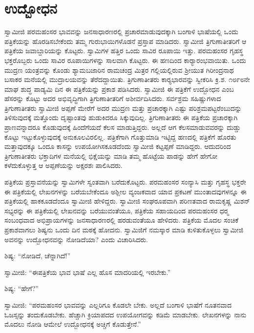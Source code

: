 
\chapter{ಉದ್ಬೋಧನ }

 ಸ್ವಾಮೀಜಿ ಪರಮಹಂಸರ ಭಾವವನ್ನು ಜನಸಾಧಾರಣರಲ್ಲಿ ಪ್ರಚಾರಮಾಡುವುದಕ್ಕಾಗಿ ಬಂಗಾಳಿ ಭಾಷೆಯಲ್ಲಿ ಒಂದು ಪತ್ರಿಕೆಯನ್ನು ಹೊರಡಿಸಬೇಕೆಂದು ತಮ್ಮ ಗುರುಭಾಯಿಗಳೊಡನೆ ಪ್ರಸ್ತಾಪ ಮಾಡಿದರು. ಸ್ವಾಮೀಜಿ ತ್ರಿಗುಣಾತೀತರಿಗೆ ಆ ಪತ್ರಿಕೆಯ ಜವಾಬ್ದಾರಿಯನ್ನು ಕೊಟ್ಟರು. ಸ್ವಾಮಿಗಳ ಹತ್ತಿರ ಒಂದು ಸಾವಿರ ರೂಪಾಯಿ ಇತ್ತು. ಪರಮಹಂಸರ ಗೃಹಸ್ಥ ಭಕ್ತರೊಬ್ಬರು ಒಂದು ಸಾವಿರ ರೂಪಾಯಿಗಳನ್ನು ಸಾಲವಾಗಿ ಕೊಟ್ಟರು. ಈ ಹಣದಿಂದ ಕಾರ‍್ಯಾರಂಭವಾಯಿತು. ಒಂದು ಮುದ್ರಣ ಯಂತ್ರವನ್ನು ಕೊಂಡು ಶ್ಯಾಮಬಜಾರಿನ ರಾಮಚಂದ್ರ ಮಿತ್ರರ ಗಲ್ಲಿಯಲ್ಲಿರುವ ಶ‍್ರೀಯುತ ಗಿರೀಂದ್ರನಾಥ ಬಸಾಕರ ಮನೆಯಲ್ಲಿ ಮುದ್ರಾಲಯವನ್ನು ತೆರೆದದ್ದಾಯಿತು. ತ್ರಿಗುಣಾತೀತರು ಕಾರ‍್ಯಭಾರವನ್ನು ಸ್ವೀಕರಿಸಿ ಕ್ರಿ.ಶ. ೧೮೯೮ನೇ ಮಾಘ ಶುದ್ಧ ಪಾಡ್ಯಮಿ ದಿನ ಈ ಪತ್ರಿಕೆಯನ್ನು ಪ್ರಕಾಶ ಪಡಿಸಿದರು. ಸ್ವಾಮೀಜಿ ಈ ಪತ್ರಿಕೆಗೆ ಉದ್ಬೋಧನ ಎಂಬ ಹೆಸರನ್ನು ಕೊಟ್ಟು ಅದರ ಅಭಿವೃದ್ಧಿಗಾಗಿ ತ್ರಿಗುಣಾತೀತರಿಗೆ ಅಶೀರ್ವದಿಸಿದರು. ಸರ್ವಶ್ರಮ ಸಹಿಷ್ಣುಗಳಾದ ತ್ರಿಗುಣಾತೀತರು ಸ್ವಾಮೀಜಿ ಅಪ್ಪಣೆ ಮೇರೆಗೆ ಅದರ ಮುದ್ರಣ ಮತ್ತು ಪ್ರಚಾರಕ್ಕಾಗಿ ಎಷ್ಟು ಪರಿಶ್ರಮಪಟ್ಟರೆಂಬುದನ್ನು ತಿಳಿಸುವುದಕ್ಕೆ ಮತ್ತೊಂದು ದೃಷ್ಟಾಂತವು ಹುಡುಕಿದರೂ ಸಿಕ್ಕುವುದಿಲ್ಲ. ತ್ರಿಗುಣಾತೀತರು ಈ ಪತ್ರಿಕೆಯ ಪ್ರಚಾರಕ್ಕಾಗಿ ಪ್ರಾಣವನ್ನಾದರೂ ಕೊಡುವುದಕ್ಕೆ ಹಿಂದೆಗೆಯದೆ ಕೆಲಸ ಮಾಡುತ್ತಿದ್ದರು. ಅಲ್ಲದೆ ಆಗ ಕೆಲಸಮಾಡುವವರನ್ನು ದುಡ್ಡು ಕೊಟ್ಟು ಇಟ್ಟುಕೊಳ್ಳುವುದಕ್ಕೆ ಅನುಕೂಲವಿರಲಿಲ್ಲ. ಪತ್ರಿಕೆಗಾಗಿ ಗೊತ್ತುಮಾಡಿ ಇಟ್ಟಿದ್ದ ಹಣದಲ್ಲಿ ಪತ್ರಿಕೆಗೆ ಹೊರತು ಮತ್ತಾವುದಕ್ಕೂ ಒಂದೂ ಕಾಸನ್ನು ಉಪಯೋಗಿಸಕೂಡದೆಂದು ಸ್ವಾಮೀಜಿ ಕಟ್ಟಪ್ಪಣೆ ಮಾಡಿದ್ದರು. ಆದುದರಿಂದ ತ್ರಿಗುಣಾತೀತರು ಭಕ್ತಾದಿಗಳ ಮನೆಯಲ್ಲಿ ಭಿಕ್ಷೆಯನ್ನು ಮಾಡಿ ತಮ್ಮ ಹೊಟ್ಟೆಯ ಪಾಡನ್ನು ಹೇಗೆ ಹೇಗೋ ಕಳೆದುಕೊಳ್ಳುತ್ತ ಆ ಅಪ್ಪಣೆಯನ್ನು ಅಕ್ಷರಶಃ ಪಾಲಿಸಿದರು. 

 ಪತ್ರಿಕೆಯ ಪ್ರಸ್ತಾವನೆಯನ್ನು ಸ್ವಾಮಿಗಳೇ ಸ್ವಂತವಾಗಿ ಬರೆದುಕೊಟ್ಟರು. ಪರಮಹಂಸರ ಸಂನ್ಯಾಸಿ ಮತ್ತು ಗೃಹಸ್ಥ ಭಕ್ತರೇ ಈ ಪತ್ರಿಕೆಯಲ್ಲಿ ಲೇಖನಗಳನ್ನು ಬರೆಯಬೇಕೆಂದೂ ಅಶ್ಲೀಲ ವ್ಯಂಜಕವಾದ ಯಾವ ಪ್ರಕಟಣೆ ಮುಂತಾದವುಗಳನ್ನೂ ಈ ಪತ್ರಿಕೆಯಲ್ಲಿ ಹಾಕಕೂಡದೆಂದೂ ಸ್ವಾಮೀಜಿ ಹೇಳಿದ್ದರು. ಸ್ವಾಮೀಜಿ ಸಂಘರೂಪವಾಗಿ ಪರಿಣತವಾದ ರಾಮಕೃಷ್ಣ ಮಿಶನ್ ಸಭ್ಯರನ್ನು ಈ ಪತ್ರಿಕೆಯಲ್ಲಿ ಲೇಖನವನ್ನು ಬರೆಯುವಂತೆಯೂ, ಪತ್ರಿಕೆಯ ಸಹಾಯದಿಂದ ಪರಮಹಂಸರ ಧರ‍್ಮ ಸಂಬಂಧವಾದ ಅಭಿಪ್ರಾಯಗಳನ್ನು ಜನಸಾಧಾರಣರಲ್ಲಿ ಹರಡುವಂತೆಯೂ ಹೇಳಿದರು. ಪತ್ರಿಕೆಯ ಮೊದಲ ಸಂಚಿಕೆ ಪ್ರಕಾಶವಾಗಲು ಶಿಷ್ಯನು ಒಂದು ದಿನ ಮಠಕ್ಕೆ ಹೋದನು. ಸ್ವಾಮಿಜಿಗೆ ನಮಸ್ಕಾರ ಮಾಡಿ ಕುಳಿತುಕೊಳ್ಳಲು ಸ್ವಾಮೀಜಿ ಅವನನ್ನು ಉದ್ಬೋಧನವನ್ನು ನೋಡಿದೆಯಾ? ಎಂದು ವಿಚಾರಿಸಿದರು. 

 ಶಿಷ್ಯ: “ನೋಡಿದೆ, ಚೆನ್ನಾಗಿದೆ!” 

 ಸ್ವಾಮೀಜಿ: “ಈ‌ಪತ್ರಿಕೆಯ ಭಾವ ಭಾಷೆ ಎಲ್ಲ ಹೊಸ ಮಾದರಿಯಲ್ಲಿ ಇರಬೇಕು.” 

 ಶಿಷ್ಯ: “ಹೇಗೆ?” 

 ಸ್ವಾಮೀಜಿ: “ಪರಮಹಂಸರ ಭಾವವನ್ನು ಎಲ್ಲರಿಗೂ ಕೊಡಲೇ ಬೇಕು. ಅಲ್ಲದೆ ಬಂಗಾಳಿ ಭಾಷೆಗೆ ನೂತನವಾದ ಓಜಸ್ಸನ್ನು ತಂದುಕೊಡಬೇಕು. ಹೆಚ್ಚಾಗಿ ಕ್ರಿಯಾಪದದ ಉಪಯೋಗವನ್ನು ಕಡಿಮೆ ಮಾಡಬೇಕು. ಲೇಖನಗಳನ್ನು ನಾನು ಮೊದಲು ನೋಡಿ ಆಮೇಲೆ ಉದ್ಬೋಧನಕ್ಕೆ ಅಚ್ಚಿಗೆ ಕೊಡುತ್ತೇನೆ.” 

